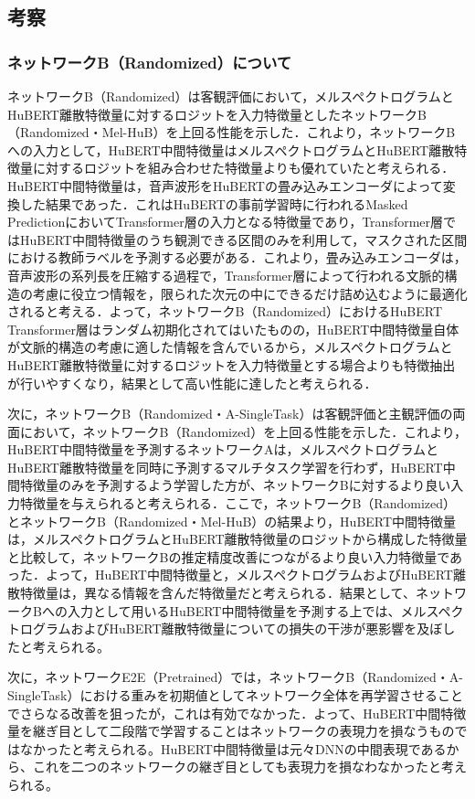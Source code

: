 \subsection{考察}
\subsubsection{ネットワークB（Randomized）について}
\label{sec4:sec:consideration_b_randomized}
ネットワークB（Randomized）は客観評価において，メルスペクトログラムとHuBERT離散特徴量に対するロジットを入力特徴量としたネットワークB（Randomized・Mel-HuB）を上回る性能を示した．これより，ネットワークBへの入力として，HuBERT中間特徴量はメルスペクトログラムとHuBERT離散特徴量に対するロジットを組み合わせた特徴量よりも優れていたと考えられる．HuBERT中間特徴量は，音声波形をHuBERTの畳み込みエンコーダによって変換した結果であった．これはHuBERTの事前学習時に行われるMasked PredictionにおいてTransformer層の入力となる特徴量であり，Transformer層ではHuBERT中間特徴量のうち観測できる区間のみを利用して，マスクされた区間における教師ラベルを予測する必要がある．これより，畳み込みエンコーダは，音声波形の系列長を圧縮する過程で，Transformer層によって行われる文脈的構造の考慮に役立つ情報を，限られた次元の中にできるだけ詰め込むように最適化されると考える．よって，ネットワークB（Randomized）におけるHuBERT Transformer層はランダム初期化されてはいたものの，HuBERT中間特徴量自体が文脈的構造の考慮に適した情報を含んでいるから，メルスペクトログラムとHuBERT離散特徴量に対するロジットを入力特徴量とする場合よりも特徴抽出が行いやすくなり，結果として高い性能に達したと考えられる．

次に，ネットワークB（Randomized・A-SingleTask）は客観評価と主観評価の両面において，ネットワークB（Randomized）を上回る性能を示した．これより，HuBERT中間特徴量を予測するネットワークAは，メルスペクトログラムとHuBERT離散特徴量を同時に予測するマルチタスク学習を行わず，HuBERT中間特徴量のみを予測するよう学習した方が、ネットワークBに対するより良い入力特徴量を与えられると考えられる．ここで，ネットワークB（Randomized）とネットワークB（Randomized・Mel-HuB）の結果より，HuBERT中間特徴量は，メルスペクトログラムとHuBERT離散特徴量のロジットから構成した特徴量と比較して，ネットワークBの推定精度改善につながるより良い入力特徴量であった．よって，HuBERT中間特徴量と，メルスペクトログラムおよびHuBERT離散特徴量は，異なる情報を含んだ特徴量だと考えられる．結果として、ネットワークBへの入力として用いるHuBERT中間特徴量を予測する上では、メルスペクトログラムおよびHuBERT離散特徴量についての損失の干渉が悪影響を及ぼしたと考えられる。

次に，ネットワークE2E（Pretrained）では，ネットワークB（Randomized・A-SingleTask）における重みを初期値としてネットワーク全体を再学習させることでさらなる改善を狙ったが，これは有効でなかった．よって、HuBERT中間特徴量を継ぎ目として二段階で学習することはネットワークの表現力を損なうものではなかったと考えられる。HuBERT中間特徴量は元々DNNの中間表現であるから、これを二つのネットワークの継ぎ目としても表現力を損なわなかったと考えられる。

